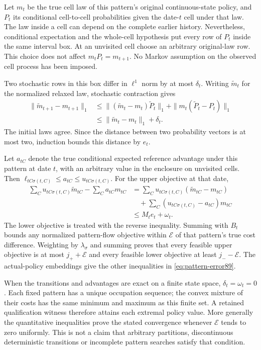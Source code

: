 Let $m_t$ be the true cell law of this pattern's original continuous-state policy, and $P_t$ its conditional cell-to-cell probabilities given the date-$t$ cell under that law. The law inside a cell can depend on the complete earlier history. Nevertheless, conditional expectation and the whole-cell hypothesis put every row of $P_t$ inside the same interval box. At an unvisited cell choose an arbitrary original-law row. This choice does not affect $m_tP_t=m_{t+1}$. No Markov assumption on the observed cell process has been imposed.

Two stochastic rows in this box differ in $\ell^1$ norm by at most $\delta_t$. Writing $\widetilde m_t$ for the normalized relaxed law, stochastic contraction gives
\begin{align*}
 \|\widetilde m_{t+1}-m_{t+1}\|_1
 &\le\|(\widetilde m_t-m_t)\widetilde P_t\|_1
       +\|m_t(\widetilde P_t-P_t)\|_1\\
 &\le\|\widetilde m_t-m_t\|_1+\delta_t.
\end{align*}
The initial laws agree. Since the distance between two probability vectors is at most two, induction bounds this distance by $e_t$.

Let $a_{tC}$ denote the true conditional expected reference advantage under this pattern at date $t$, with an arbitrary value in the enclosure on unvisited cells. Then $\ell_{tC\sigma(t,C)}\le a_{tC}\le u_{tC\sigma(t,C)}$. For the upper objective at that date,
\begin{align*}
 \sum_Cu_{tC\sigma(t,C)}\widetilde m_{tC}-\sum_Ca_{tC}m_{tC}
 &=\sum_Cu_{tC\sigma(t,C)}(\widetilde m_{tC}-m_{tC})\\
 &\quad+\sum_C(u_{tC\sigma(t,C)}-a_{tC})m_{tC}\\
 &\le M_te_t+\omega_t.
\end{align*}
The lower objective is treated with the reverse inequality. Summing with $B_t$ bounds any normalized pattern-flow objective within $\mathcal E$ of that pattern's true cost difference. Weighting by $\lambda_\sigma$ and summing proves that every feasible upper objective is at most $j_++\mathcal E$ and every feasible lower objective at least $j_- -\mathcal E$. The actual-policy embeddings give the other inequalities in \eqref{eq:pattern-error89}.

When the transitions and advantages are exact on a finite state space, $\delta_t=\omega_t=0$. Each fixed pattern has a unique occupation sequence; the convex mixture of their costs has the same minimum and maximum as this finite set. A retained qualification witness therefore attains each extremal policy value. More generally the quantitative inequalities prove the stated convergence whenever $\mathcal E$ tends to zero uniformly. This is not a claim that arbitrary partitions, discontinuous deterministic transitions or incomplete pattern searches satisfy that condition.

